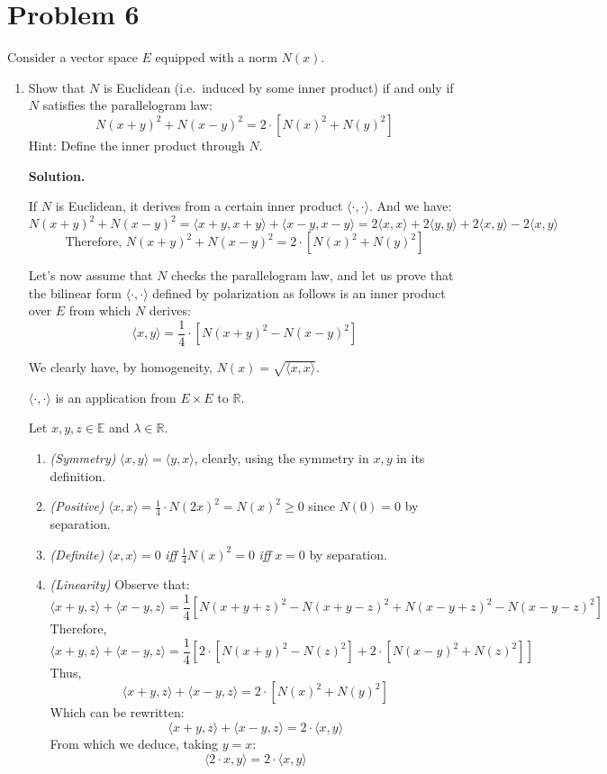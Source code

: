\documentclass[12pt]{article}
\newcommand{\R}{\mathbb{R}}
\newcommand{\E}{\mathbb{E}}
\newenvironment{solution}{\vspace{0.2cm} \textbf{Solution.}}{}
\begin{document}
\newpage

	\section*{Problem 6}
	Consider a vector space $E$ equipped with a norm $N(x)$.

	\begin{enumerate}[label=(\alph*)]
		\item Show that $N$ is Euclidean (i.e.\ induced by some inner product) if and only if $N$ satisfies the parallelogram law: $$N(x + y)^2 + N(x - y)^2 = 2 \cdot [N(x)^2 + N(y)^2]$$
		Hint: Define the inner product through $N$.
	
		\begin{solution}
		
		If $N$ is Euclidean, it derives from a certain inner product $\langle \cdot,\cdot \rangle$. And we have:
		$$ N(x+y)^2 + N(x-y)^2 = \langle x+y,x+y \rangle + \langle x-y,x-y \rangle = 2 \langle x,x\rangle  + 2 \langle y,y \rangle + 2\langle x,y\rangle -2\langle x,y\rangle$$
		$$ \text{Therefore, }N(x+y)^2 + N(x-y)^2 = 2 \cdot \left[ N(x)^2 + N(y)^2 \right]$$
		
		Let's now assume that $N$ checks the parallelogram law, and let us prove that the bilinear form $\langle \cdot,\cdot \rangle$ defined by polarization as follows is an inner product over $E$ from which $N$ derives:
		$$ \langle x,y\rangle = \frac{1}{4} \cdot \left[ N(x+y)^2 - N(x-y)^2 \right]$$
		
		We clearly have, by homogeneity, $N(x) = \sqrt{\langle x,x \rangle}$.
		
		$\langle \cdot,\cdot \rangle$ is an application from $E \times E$ to $\R$.
		
		Let $x,y,z \in \E$ and $\lambda \in \R$.
		\begin{enumerate}[label={\roman*)}]
			\item \textit{(Symmetry)} $\langle x,y\rangle = \langle y,x\rangle$, clearly, using the symmetry in $x,y$ in its definition.
			\item \textit{(Positive)}  $\langle x,x \rangle = \frac{1}{4} \cdot N(2x)^2 = N(x)^2 \geqslant 0$ since $N(0) = 0$ by separation.
			\item \textit{(Definite)} $\langle x,x \rangle = 0$ \textit{iff} $\frac{1}{4}N(x)^2 = 0$ \textit{iff} $x=0$ by separation.
			\item \textit{(Linearity)} Observe that: $$\langle x+y, z \rangle + \langle x-y,z \rangle = \frac{1}{4} \left[ N(x+y+z)^2 - N(x+y-z)^2 + N(x-y+z)^2 - N(x-y-z)^2 \right]$$
			Therefore,
			$$\langle x+y, z \rangle + \langle x-y,z \rangle = \frac{1}{4} \left[ 2\cdot \left[ N(x+y)^2 - N(z)^2 \right] + 2 \cdot \left[ N(x-y)^2 + N(z)^2 \right] \right]$$
			Thus,
			$$ \langle x+y, z \rangle + \langle x-y,z \rangle = 2 \cdot \left[ N(x)^2 + N(y)^2\right]$$
			Which can be rewritten:
			$$ \langle x+y, z \rangle + \langle x-y,z \rangle = 2 \cdot \langle x,y \rangle$$
			From which we deduce, taking $y=x$:
			$$ \langle 2 \cdot x, y \rangle = 2 \cdot \langle x,y \rangle$$ 
			

\end{enumerate}
\end{solution}
\end{enumerate}
\end{document}
